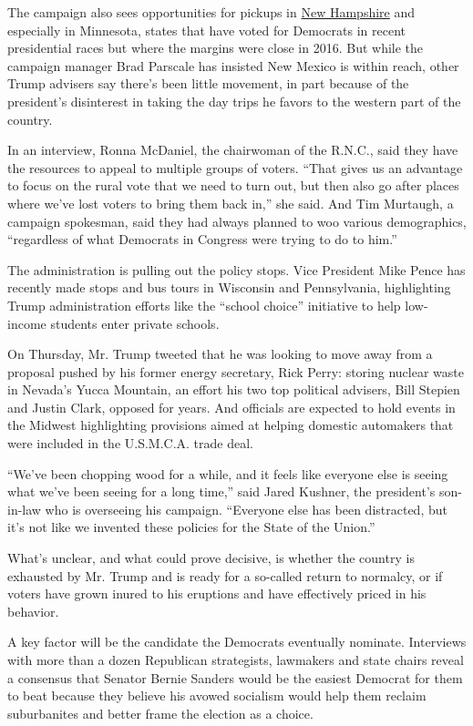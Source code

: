 The campaign also sees opportunities for pickups in
\href{https://www.nytimes3xbfgragh.onion/live/2020/new-hampshire-primary-02-11}{New
Hampshire} and especially in Minnesota, states that have voted for
Democrats in recent presidential races but where the margins were close
in 2016. But while the campaign manager Brad Parscale has insisted New
Mexico is within reach, other Trump advisers say there's been little
movement, in part because of the president's disinterest in taking the
day trips he favors to the western part of the country.

In an interview, Ronna McDaniel, the chairwoman of the R.N.C., said they
have the resources to appeal to multiple groups of voters. ``That gives
us an advantage to focus on the rural vote that we need to turn out, but
then also go after places where we've lost voters to bring them back
in,'' she said. And Tim Murtaugh, a campaign spokesman, said they had
always planned to woo various demographics, ``regardless of what
Democrats in Congress were trying to do to him.''

The administration is pulling out the policy stops. Vice President Mike
Pence has recently made stops and bus tours in Wisconsin and
Pennsylvania, highlighting Trump administration efforts like the
``school choice'' initiative to help low-income students enter private
schools.

On Thursday, Mr. Trump tweeted that he was looking to move away from a
proposal pushed by his former energy secretary, Rick Perry: storing
nuclear waste in Nevada's Yucca Mountain, an effort his two top
political advisers, Bill Stepien and Justin Clark, opposed for years.
And officials are expected to hold events in the Midwest highlighting
provisions aimed at helping domestic automakers that were included in
the U.S.M.C.A. trade deal.

``We've been chopping wood for a while, and it feels like everyone else
is seeing what we've been seeing for a long time,'' said Jared Kushner,
the president's son-in-law who is overseeing his campaign. ``Everyone
else has been distracted, but it's not like we invented these policies
for the State of the Union.''

What's unclear, and what could prove decisive, is whether the country is
exhausted by Mr. Trump and is ready for a so-called return to normalcy,
or if voters have grown inured to his eruptions and have effectively
priced in his behavior.

A key factor will be the candidate the Democrats eventually nominate.
Interviews with more than a dozen Republican strategists, lawmakers and
state chairs reveal a consensus that Senator Bernie Sanders would be the
easiest Democrat for them to beat because they believe his avowed
socialism would help them reclaim suburbanites and better frame the
election as a choice.

